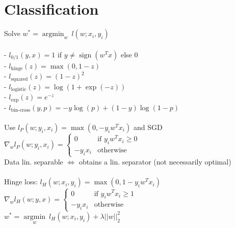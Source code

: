 \section*{Classification}
Solve $w^* = \operatorname{argmin}_w ~ l(w;x_i,y_i)$\\
\\
{- $l_{0/1} \left(y,x\right) = 1$  if $y \neq \operatorname{sign}\left(w^Tx\right)$ else 0}\\
- $l_{\text{hinge}}(z) = \max\left(0,1-z\right) $ \\
- $l_{\text{squared}}(z) = (1-z)^2$\hfill\\
- $l_{\text{logistic}}(z) = \log\left(1+\exp(-z)\right)$ \\
- $l_{\text{exp}}(z) = e^{-z}$ \\
- $l_{\text{bin-cross}}(y,p) = - y\log(p) + (1-y)\log(1-p)$\\
\\
Use $l_P (w;y_i,x_i) = \operatorname{max}(0, -y_i w^T x_i)$ and SGD\\
$\nabla_w l_P(w;y_i,x_i) = 
\begin{cases}
    0 &\text{if } y_i w^T x_i \geq 0\\
    -y_i x_i &\text{otherwise}
\end{cases}$ \\
Data lin. separable $\Leftrightarrow$ obtains a lin. separator (not necessarily optimal)\\
\\
Hinge loss: $l_H(w;x_i,y_i) = \operatorname{max}(0,1-y_i w^T x_i)$ \\
$\nabla_w l_H(w;y,x) = 
\begin{cases}
    0 &\text{if } y_i w^T x_i \geq 1\\
    -y_i x_i &\text{otherwise}
\end{cases}$\\
$w^* = \underset{w}{\operatorname{argmin}} ~ l_H(w;x_i,y_i) + \lambda||w||_2^2$

